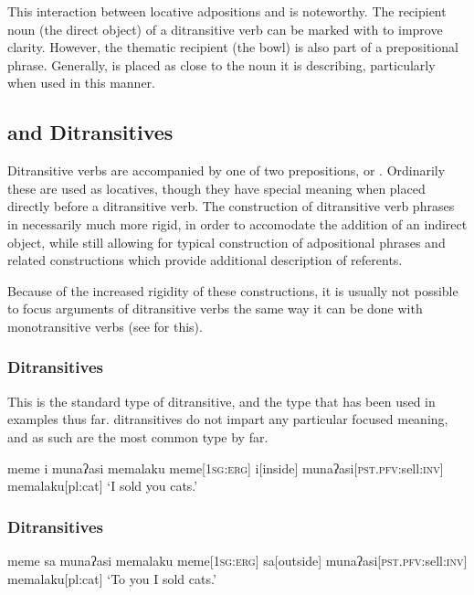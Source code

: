 This interaction between locative adpositions and  is noteworthy. The recipient noun (the direct object) of a ditransitive verb can be marked with  to improve clarity. However, the thematic recipient (the bowl) is also part of a prepositional phrase. Generally,  is placed as close to the noun it is describing, particularly when used in this manner.

\subsection{ and  Ditransitives}\label{sec:i_sa_ditrans}
Ditransitive verbs are accompanied by one of two prepositions,  or . Ordinarily these are used as locatives, though they have special meaning when placed directly before a ditransitive verb. The construction of ditransitive verb phrases in necessarily much more rigid, in order to accomodate the addition of an indirect object, while still allowing for typical construction of adpositional phrases and related constructions which provide additional description of referents.

Because of the increased rigidity of these constructions, it is usually not possible to focus arguments of ditransitive verbs the same way it can be done with monotransitive verbs (see  for this).

\subsubsection{ Ditransitives}

This is the standard type of ditransitive, and the type that has been used in examples thus far.  ditransitives do not impart any particular focused meaning, and as such are the most common type by far.

\ex
\begingl
\glpreamble meme i munaʔasi memalaku
\endpreamble
meme[\textsc{1sg:erg}]
i[inside]
munaʔasi[\textsc{pst.pfv:}sell\textsc{:inv}]
memalaku[pl:cat]
\glft `I sold you cats.'
\endgl
\xe

\subsubsection{ Ditransitives}

\ex
\begingl
\glpreamble meme sa munaʔasi memalaku
\endpreamble
meme[\textsc{1sg:erg}]
sa[outside]
munaʔasi[\textsc{pst.pfv:}sell\textsc{:inv}]
memalaku[pl:cat]
\glft `To you I sold cats.'\footnotemark
\endgl
\xe

